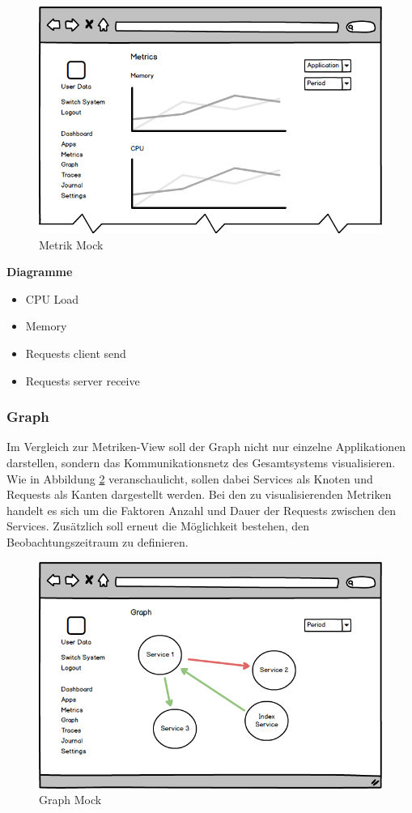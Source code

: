 \vspace{0.3cm}

\begin{figure}[h]
 \centering
 \includegraphics[width=0.6\linewidth]{kapitel1/mocks/metrics.png}
 \caption{Metrik Mock}
  \label{fig:metrics}
\end{figure}

\textbf{Diagramme}

\begin{itemize}
\item CPU Load
\item Memory
\item Requests client send
\item Requests server receive
\end{itemize}


\subsubsection{Graph}

Im Vergleich zur Metriken-View soll der Graph nicht nur einzelne Applikationen darstellen,
sondern das Kommunikationsnetz des Gesamtsystems visualisieren.
Wie in Abbildung \ref{fig:graph} veranschaulicht, sollen dabei Services als Knoten und Requests als Kanten dargestellt werden.
Bei den zu visualisierenden Metriken handelt es sich um die Faktoren Anzahl und Dauer der Requests zwischen den Services.
Zusätzlich soll erneut die Möglichkeit bestehen, den Beobachtungszeitraum zu definieren.
\vspace{0.3cm}

\begin{figure}[h]
 \centering
 \includegraphics[width=0.6\linewidth]{kapitel1/mocks/graph.png}
 \caption{Graph Mock}
 \label{fig:graph}
\end{figure}

